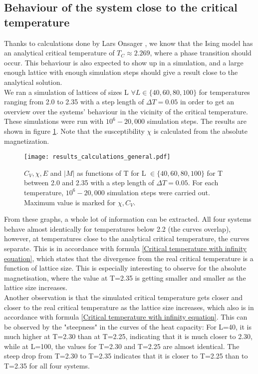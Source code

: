 \documentclass[10pt,a4paper]{article}
\begin{document}
\subsection{Behaviour of the system close to the critical temperature}
Thanks to calculations done by Lars Onsager \cite{onsager1944two}, we know that the Ising model has an analytical critical temperature of $T_C\approx2.269$, where a phase transition should occur. This behaviour is also expected to show up in a simulation, and a large enough lattice with enough simulation steps should give a result close to the analytical solution.\\We ran a simulation of lattices of sizes L $\forall L \in \{40,60,80,100\}$ for temperatures ranging from 2.0 to 2.35 with a step length of $\Delta T=0.05$ in order to get an overview over the systems' behaviour in the vicinity of the critical temperature. These simulations were run with $10^6-20,000$ simulation steps. The results are shown in figure \ref{for T between 2.0 and 2.35}. Note that the susceptibility $\chi$ is calculated from the absolute magnetization. 
\begin{figure}[H]
\texttt{[image: results\_calculations\_general.pdf]}
\caption[$C_V,\chi,E, |M|$ for T between 2.0 and 2.35]{$C_V,\chi,E$ and $|M|$ as functions of T for  L $ \in \{40,60,80,100\}$ for T between 2.0 and 2.35 with a step length of $\Delta T=0.05$. For each temperature, $10^6-20,000$ simulation steps were carried out. Maximum value is marked for $\chi,C_V$.}\label{for T between 2.0 and 2.35}
\end{figure}
From these graphs, a whole lot of information can be extracted. All four systems behave almost identically for temperatures below 2.2 (the curves overlap), however, at temperatures close to the analytical critical temperature, the curves separate. This is in accordance with formula \eqref{Critical temperature with infinity equation}, which states that the divergence from the real critical temperature is a function of lattice size. This is especially interesting to observe for the absolute magnetisation, where the value at T=2.35 is getting smaller and smaller as the lattice size increases.\\
Another observation is that the simulated critical temperature gets closer and closer to the real critical temperature as the lattice size increases, which also is in accordance with formula \eqref{Critical temperature with infinity equation}. This can be observed by the "steepness" in the curves of the heat capacity: For L=40, it is much higher at T=2.30 than at T=2.25, indicating that it is much closer to 2.30, while at L=100, the values for T=2.30 and T=2.25 are almost identical. The steep drop from T=2.30 to T=2.35 indicates that it is closer to T=2.25 than to T=2.35 for all four systems.\\
\end{document}
